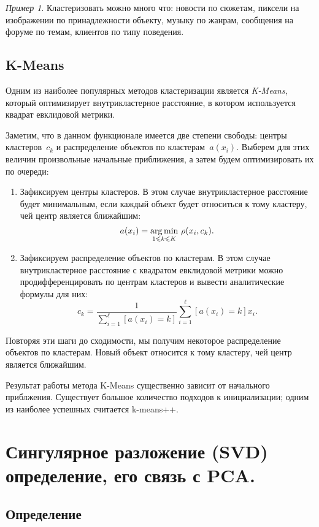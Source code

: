 \documentclass[a4paper, 12pt]{article}
\newcommand{\argmin}{\mathop{\rm arg\,min}\limits}
\renewcommand{\leq}{\leqslant}
\theoremstyle{plain} %
\theoremstyle{definition} %
\theoremstyle{remark} %
\newtheorem{example}{Пример}
\begin{document}
\begin{example}
Кластеризовать можно много что: новости по сюжетам, пиксели на изображении по принадлежности объекту,
музыку по жанрам, сообщения на форуме по темам, клиентов по типу поведения.

\subsection{K-Means}
Одним из наиболее популярных методов кластеризации является \emph{K-Means},
который оптимизирует внутрикластерное расстояние,
в котором используется квадрат евклидовой метрики.

Заметим, что в данном функционале имеется две степени свободы:
центры кластеров~$c_k$ и распределение объектов по кластерам~$a(x_i)$.
Выберем для этих величин произвольные начальные приближения,
а затем будем оптимизировать их по очереди:
\begin{enumerate}
    \item Зафиксируем центры кластеров.
        В этом случае внутрикластерное расстояние будет минимальным,
        если каждый объект будет относиться к тому кластеру, чей центр является ближайшим:
        \[
            a(x_i)
            =
            \underset{1 \leq k \leq K}{\argmin}~
                \rho(x_i, c_k).
        \]
    \item Зафиксируем распределение объектов по кластерам.
        В этом случае внутрикластерное расстояние с квадратом евклидовой метрики можно продифференцировать
        по центрам кластеров и вывести аналитические формулы для них:
        \[
            c_k
            =
            \frac{1}{\sum_{i = 1}^{\ell} [a(x_i) = k]}
            \sum_{i = 1}^{\ell}
                [a(x_i) = k] x_i.
        \]
\end{enumerate}

Повторяя эти шаги до сходимости, мы получим некоторое распределение объектов по кластерам.
Новый объект относится к тому кластеру, чей центр является ближайшим.

Результат работы метода K-Means существенно зависит от начального приблжения.
Существует большое количество подходов к инициализации;
одним из наиболее успешных считается k-means++.

\section{Сингулярное разложение (SVD) определение, его связь с PCA.}

\subsection{Определение}


\end{example}
\end{document}
